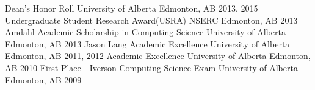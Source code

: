 \begin{cvhonors}
    \cvhonor
    {Dean's Honor Roll}
    {University of Alberta}
    {Edmonton, AB}
    {2013, 2015}
    \cvhonor
    {Undergraduate Student Research Award(USRA)}
    {NSERC}
    {Edmonton, AB}
    {2013}
    \cvhonor
    {Amdahl Academic Scholarship in Computing Science}
    {University of Alberta}
    {Edmonton, AB}
    {2013}
    \cvhonor
    {Jason Lang Academic Excellence}
    {University of Alberta}
    {Edmonton, AB}
    {2011, 2012}
    \cvhonor
    {Academic Excellence}
    {University of Alberta}
    {Edmonton, AB}
    {2010}
    \cvhonor
    {First Place - Iverson Computing Science Exam}
    {University of Alberta}
    {Edmonton, AB}
    {2009}
\end{cvhonors}

